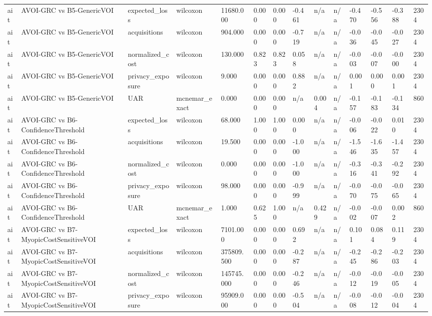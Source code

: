 \begin{table}[!ht]
{\begin{tabular}{llllllllllllll}
ait & AVOI-GRC vs B5-GenericVOI & expected\_loss & wilcoxon & 11680.000 & 0.000 & 0.000 & -0.461 & n/a & n/a & -0.470 & -0.556 & -0.388 & 2304 \\
ait & AVOI-GRC vs B5-GenericVOI & acquisitions & wilcoxon & 904.000 & 0.000 & 0.000 & -0.719 & n/a & n/a & -0.036 & -0.045 & -0.027 & 2304 \\
ait & AVOI-GRC vs B5-GenericVOI & normalized\_cost & wilcoxon & 130.000 & 0.823 & 0.823 & 0.058 & n/a & n/a & -0.003 & -0.007 & -0.000 & 2304 \\
ait & AVOI-GRC vs B5-GenericVOI & privacy\_exposure & wilcoxon & 9.000 & 0.000 & 0.000 & 0.882 & n/a & n/a & 0.001 & 0.000 & 0.001 & 2304 \\
ait & AVOI-GRC vs B5-GenericVOI & UAR & mcnemar\_exact & 0.000 & 0.000 & 0.000 & n/a & 0.004 & n/a & -0.157 & -0.183 & -0.134 & 860 \\
ait & AVOI-GRC vs B6-ConfidenceThreshold & expected\_loss & wilcoxon & 68.000 & 1.000 & 1.000 & 0.000 & n/a & n/a & -0.006 & -0.022 & 0.010 & 2304 \\
ait & AVOI-GRC vs B6-ConfidenceThreshold & acquisitions & wilcoxon & 19.500 & 0.000 & 0.000 & -1.000 & n/a & n/a & -1.546 & -1.635 & -1.457 & 2304 \\
ait & AVOI-GRC vs B6-ConfidenceThreshold & normalized\_cost & wilcoxon & 0.000 & 0.000 & 0.000 & -1.000 & n/a & n/a & -0.316 & -0.341 & -0.292 & 2304 \\
ait & AVOI-GRC vs B6-ConfidenceThreshold & privacy\_exposure & wilcoxon & 98.000 & 0.000 & 0.000 & -0.999 & n/a & n/a & -0.070 & -0.075 & -0.065 & 2304 \\
ait & AVOI-GRC vs B6-ConfidenceThreshold & UAR & mcnemar\_exact & 1.000 & 0.625 & 1.000 & n/a & 0.429 & n/a & -0.002 & -0.007 & 0.002 & 860 \\
ait & AVOI-GRC vs B7-MyopicCostSensitiveVOI & expected\_loss & wilcoxon & 7101.000 & 0.000 & 0.000 & 0.692 & n/a & n/a & 0.101 & 0.084 & 0.119 & 2304 \\
ait & AVOI-GRC vs B7-MyopicCostSensitiveVOI & acquisitions & wilcoxon & 375809.500 & 0.000 & 0.000 & -0.287 & n/a & n/a & -0.245 & -0.286 & -0.203 & 2304 \\
ait & AVOI-GRC vs B7-MyopicCostSensitiveVOI & normalized\_cost & wilcoxon & 145745.000 & 0.000 & 0.000 & -0.246 & n/a & n/a & -0.012 & -0.019 & -0.005 & 2304 \\
ait & AVOI-GRC vs B7-MyopicCostSensitiveVOI & privacy\_exposure & wilcoxon & 95909.000 & 0.000 & 0.000 & -0.504 & n/a & n/a & -0.008 & -0.012 & -0.004 & 2304 \\

\end{tabular}}
\end{table}
